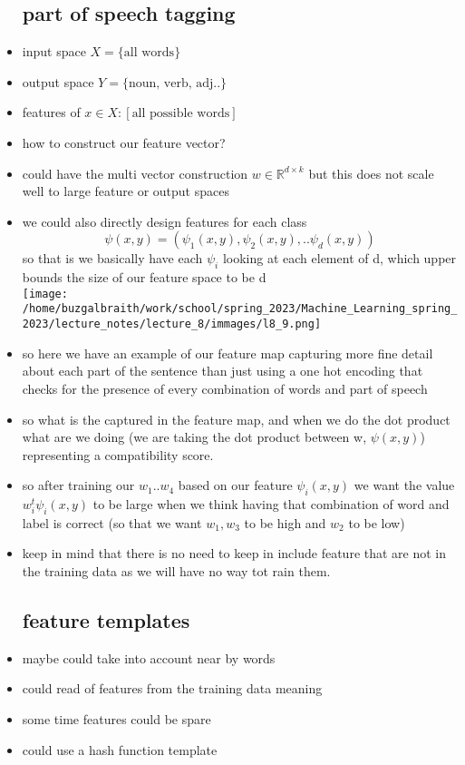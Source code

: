 \documentclass{article}
\begin{document}
\begin{itemize}
\subsection*{part of speech tagging}
\item input space $X=\{\text{all words}\}$
\item output space $Y=\{\text{noun, verb, adj..}\}$
\item features of $x\in X:[\text{all possible words}]$
\item how to construct our feature vector?
\item could have the multi vector construction $w\in \mathbb{R}^{d\times k}$ but this does not scale well to large feature or output spaces
\item we could also directly design features for each class $$\psi(x,y)=(\psi_{1}(x,y),\psi_{2}(x,y),..\psi_{d}(x,y))$$ 
so that is we basically have each $\psi_{i}$ looking at each element of d, which upper bounds the size of our feature space to be d \\
\texttt{[image: /home/buzgalbraith/work/school/spring\_2023/Machine\_Learning\_spring\_2023/lecture\_notes/lecture\_8/immages/l8\_9.png]}
\item so here we have an example of our feature map capturing more fine detail about each part of the sentence than just using a one hot encoding that checks for the presence of every combination of words and part of speech
\item so what is the captured in the feature map, and when we do the dot product what are we doing (we are taking the dot product between w, $\psi(x,y)$) representing a compatibility score. 
\item so after training our $w_1..w_4$ based on our feature $\psi_{i}(x,y)$ we want the value $w_i^{t}\psi_i(x,y)$ to be large when we think having that combination of word and label is correct (so that we want  $w_1, w_3$ to be high and $w_2$ to be low)
\item keep in mind that there is no need to keep in include feature that are not in the training data as we will have no way tot rain them.
\subsection*{feature templates}
\item   maybe could take into account near by words 
\item could read of features from the training data meaning 
\item some time features could be spare 
\item could use a hash function template

\end{itemize}
\end{document}

